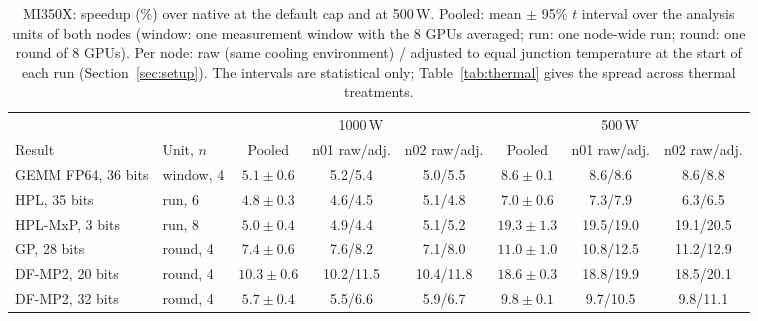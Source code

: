 \documentclass[conference]{IEEEtran}
\newcommand{\W}{\,W}
\newcommand{\pct}{\%}
\begin{document}
\begin{table}[t]
\caption{MI350X: speedup (\%) over native at the default cap and at 500\W. Pooled: mean $\pm$ 95\pct{} $t$
interval over the analysis units of both nodes (window: one measurement window with the 8 GPUs averaged; run: one
node-wide run; round: one round of 8 GPUs). Per node: raw (same cooling environment) / adjusted to equal junction
temperature at the start of each run (Section~\ref{sec:setup}). The intervals are statistical only; Table~\ref{tab:thermal}
gives the spread across thermal treatments.}\label{tab:robust}
\centering\footnotesize\setlength{\tabcolsep}{4pt}
\begin{tabular}{@{}llcccccc@{}}
\toprule
& & \multicolumn{3}{c}{1000\W} & \multicolumn{3}{c}{500\W} \\
\cmidrule(lr){3-5}\cmidrule(l){6-8}
Result & Unit, $n$ & Pooled & n01 raw/adj. & n02 raw/adj. & Pooled & n01 raw/adj. & n02 raw/adj. \\
\midrule
GEMM FP64, 36 bits & window, 4 & $5.1\pm0.6$ & 5.2/5.4 & 5.0/5.5 & $8.6\pm0.1$ & 8.6/8.6 & 8.6/8.8 \\
HPL, 35 bits & run, 6 & $4.8\pm0.3$ & 4.6/4.5 & 5.1/4.8 & $7.0\pm0.6$ & 7.3/7.9 & 6.3/6.5 \\
HPL-MxP, 3 bits & run, 8 & $5.0\pm0.4$ & 4.9/4.4 & 5.1/5.2 & $19.3\pm1.3$ & 19.5/19.0 & 19.1/20.5 \\
GP, 28 bits & round, 4 & $7.4\pm0.6$ & 7.6/8.2 & 7.1/8.0 & $11.0\pm1.0$ & 10.8/12.5 & 11.2/12.9 \\
DF-MP2, 20 bits & round, 4 & $10.3\pm0.6$ & 10.2/11.5 & 10.4/11.8 & $18.6\pm0.3$ & 18.8/19.9 & 18.5/20.1 \\
DF-MP2, 32 bits & round, 4 & $5.7\pm0.4$ & 5.5/6.6 & 5.9/6.7 & $9.8\pm0.1$ & 9.7/10.5 & 9.8/11.1 \\
\bottomrule
\end{tabular}
\end{table}
\end{document}
